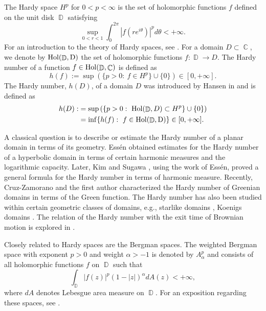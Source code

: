 \documentclass[11pt, letterpaper,leqno]{amsart}
\numberwithin{equation}{section}
\theoremstyle{definition}
\DeclareMathOperator{\D}{\mathbb{D}}
\DeclareMathOperator{\C}{\mathbb{C}}
\begin{document}
\medskip


The Hardy space $H^p$ for $0<p<\infty$ is the set of holomorphic functions $f$ defined on the unit disk $\D$ satisfying
\[
\sup_{0<r<1}\int_{0}^{2\pi}|f(re^{i\theta})|^pd\theta<+\infty.
\]
For an introduction to the theory of Hardy spaces, see \cite{Dur}. For a domain $D\subset\C$, we denote by $\rm{Hol}(\D,D)$ the set of holomorphic functions $f:\D\to D$. The Hardy number of a function $f\in\rm{Hol}(\D,\C)$ is defined as
\[
h(f):=\sup\left(\{p>0:\ f\in H^p\}\cup\{0\}\right)\in [0,+\infty].
\]
The Hardy number, $h(D)$,  of a domain $D$ was introduced by Hansen in \cite{Hans1} and is defined as
\begin{align*}
h(D):&=\sup\left(\{p>0:\ {\rm Hol}(\D, D)\subset H^p\}\cup\{0\}\right)\\
    & =\inf\{h(f):\ f\in \rm{Hol}(\D, D)\} \in [0,+\infty].
\end{align*}

A classical question is to describe or estimate the Hardy number of a planar domain in terms of its geometry. Ess\'{e}n \cite{Ess} obtained estimates for the Hardy number of a hyperbolic domain in terms of certain harmonic measures and the logarithmic capacity. Later, Kim and Sugawa \cite{KimSug}, using the work of Ess\'{e}n, proved a general formula for the Hardy number in terms of harmonic measure. Recently, Cruz-Zamorano and the first author \cite{BZ} characterized the Hardy number of Greenian domains in terms of the Green function. The Hardy number has also been studied within certain geometric classes of domains, e.g., starlike domains \cite{Hans1}, Koenigs domains \cite{CZKR}. The relation of the Hardy number with the exit time of Brownian motion is explored in \cite{MM}. 

Closely related to Hardy spaces are the Bergman spaces. The weighted Bergman space with exponent $p>0$ and weight $\alpha>-1$ is denoted by $A_\alpha^p$ and consists of all holomorphic functions $f$ on $\D$ such that
\[
\int_{\D}|f(z)|^p\left(1-|z|\right)^{\alpha}dA(z)<+\infty,
\]
where $dA$ denotes Lebesgue area measure on $\D$. For an exposition regarding these spaces, see \cite{DurSch}.
\end{document}
